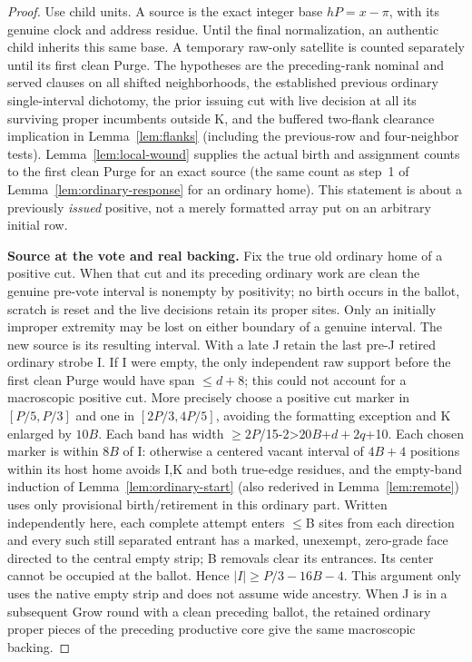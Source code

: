 \begin{proof}
Use child units. A source is the exact integer base \(hP=x-\pi\), with its genuine clock and address residue. Until the final normalization, an authentic child inherits this same base. A temporary raw-only satellite is counted separately until its first clean Purge. The hypotheses are the preceding-rank nominal and served clauses on all shifted neighborhoods, the established previous ordinary single-interval dichotomy, the prior issuing cut with live decision at all its surviving proper incumbents outside K, and the buffered two-flank clearance implication in Lemma~\ref{lem:flanks} (including the previous-row and four-neighbor tests). Lemma~\ref{lem:local-wound} supplies the actual birth and assignment counts to the first clean Purge for an exact source (the same count as step~1 of Lemma~\ref{lem:ordinary-response} for an ordinary home). This statement is about a previously \emph{issued} positive, not a merely formatted array put on an arbitrary initial row.



\textbf{Source at the vote and real backing.} Fix the true old ordinary home of a positive cut. When that cut and its preceding ordinary work are clean the genuine pre-vote interval is nonempty by positivity; no birth occurs in the ballot, scratch is reset and the live decisions retain its proper sites. Only an initially improper extremity may be lost on either boundary of a genuine interval. The new source is its resulting interval. With a late J retain the last pre-J retired ordinary strobe I. If I were empty, the only independent raw support before the first clean Purge would have span \(\le\)\(d+8\); this could not account for a macroscopic positive cut. More precisely choose a positive cut marker in \([P/5,P/3]\) and one in \([2P/3,4P/5]\), avoiding the formatting exception and K enlarged by \(10B\). Each band has width \(\ge\)\(2P\)/15-2\textgreater{}\(20B\)+\(d+2q\)+10. Each chosen marker is within \(8B\) of I: otherwise a centered vacant interval of \(4B+4\) positions within its host home avoids I,K and both true-edge residues, and the empty-band induction of Lemma~\ref{lem:ordinary-start} (also rederived in Lemma~\ref{lem:remote}) uses only provisional birth/retirement in this ordinary part. Written independently here, each complete attempt enters \(\le\)B sites from each direction and every such still separated entrant has a marked, unexempt, zero-grade face directed to the central empty strip; B removals clear its entrances. Its center cannot be occupied at the ballot. Hence \(|I|\ge P/3-16B-4\). This argument only uses the native empty strip and does not assume wide ancestry. When J is in a subsequent Grow round with a clean preceding ballot, the retained ordinary proper pieces of the preceding productive core give the same macroscopic backing.


\end{proof}
